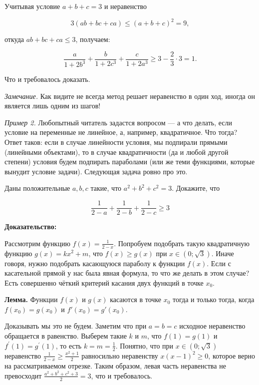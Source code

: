 Учитывая условие $a+b+c=3$ и неравенство

$$
3(a b+b c+c a) \leqslant(a+b+c)^2=9,
$$


откуда $a b+b c+c a \leqslant 3$, получаем:

$$
\frac{a}{1+2 b^3}+\frac{b}{1+2 c^3}+\frac{c}{1+2 a^3} \geqslant 3-\frac{2}{3} \cdot 3=1 .
$$

Что и требовалось доказать.

\textit{Замечание.} Как видите не всегда метод решает неравенство в один ход, иногда он является лишь одним из шагов!

\textit{Пример 2.} Любопытный читатель задастся вопросом --- а что делать, если условие на переменные не линейное, а, например, квадратичное. Что тогда? Ответ таков: если в случае линейности условия, мы подпирали прямыми (линейными объектами), то в случае квадратичности (да и любой другой степени) условия будем подпирать параболами (или же теми функциями, которые вынудит условие задачи). Следующая задача ровно про это. 

Даны положительные $a, b, c$ такие, что $a^2+b^2+c^2=3$. Докажите, что

$$
\frac{1}{2-a}+\frac{1}{2-b}+\frac{1}{2-c} \geqslant 3
$$

\textbf{Доказательство:}

Рассмотрим функцию $f(x)=\frac{1}{2-x}$. Попробуем подобрать такую квадратичную функцию $g(x)=k x^2+m$, что $f(x) \geqslant g(x)$ при $x \in(0 ; \sqrt{3})$. Иначе говоря, нужно подобрать касающуюся параболу к функции $f(x)$. Если с касательной прямой у нас была явная формула, то что же делать в этом случае? Есть совершенно чёткий критерий касания двух функций в точке $x_0$.

\textbf{Лемма.} Функции $f(x)$ и $g(x)$ касаются в точке $x_0$ тогда и только тогда, когда $f(x_0) = g(x_0)$ и $f'(x_0) = g'(x_0)$.

Доказывать мы это не будем. Заметим что при $a=b=c$ исходное неравенство обращается в равенство. Выберем такие $k$ и $m$, что $f(1)=g(1)$ и $f^{\prime}(1)=g^{\prime}(1)$, то есть $k=m=\frac{1}{2}$. Понятно, что при $x \in(0 ; \sqrt{3})$ неравенство $\frac{1}{2-x} \geqslant \frac{x^2+1}{2}$ равносильно неравенству $x(x-1)^2 \geqslant 0$, которое верно на рассматриваемом отрезке. Таким образом, левая часть неравенства не превосходит $\frac{a^2+b^2+c^2+3}{2}=3$, что и требовалось. 

\newpage

\hspace{3mm}

